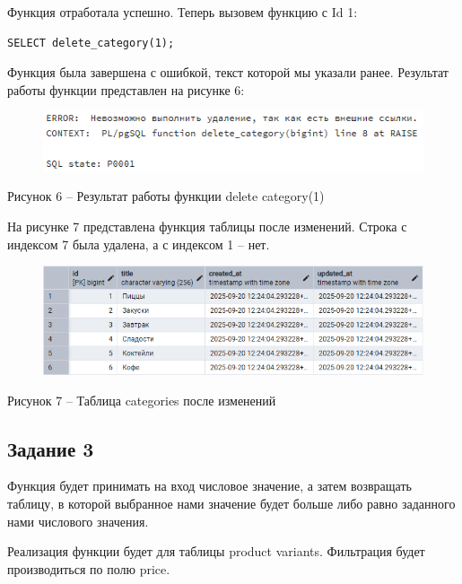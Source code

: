 \documentclass[a4paper,14pt]{extarticle}
\begin{document}
  Функция отработала успешно. Теперь вызовем функцию с Id 1:

  \noindent
  \begin{Verbatim}[tabsize=4,fontsize=\small]
SELECT delete_category(1);
  \end{Verbatim}

  Функция была завершена с ошибкой, текст которой мы указали ранее. Результат работы функции представлен на рисунке 6:

  \begin{figure}[h]
    \centering
    \includegraphics[width=0.8\linewidth]{img/t-2-1}
  \end{figure}
  \begin{center}
    Рисунок 6 – Результат работы функции delete category(1)
  \end{center}

  На рисунке 7 представлена функция таблицы после изменений. Строка с индексом 7 была удалена, а с индексом 1 – нет.

  \pagebreak
  \begin{figure}[h]
    \centering
    \includegraphics[width=1\linewidth]{img/t-2-2}
  \end{figure}
  \begin{center}
    Рисунок 7 – Таблица categories после изменений
  \end{center}

  \subsection*{Задание 3}
  Функция будет принимать на вход числовое значение, а затем возвращать таблицу, в которой выбранное нами значение будет больше либо равно заданного нами числового значения.

  Реализация функции будет для таблицы product variants. Фильтрация будет производиться по полю price.
\end{document}

